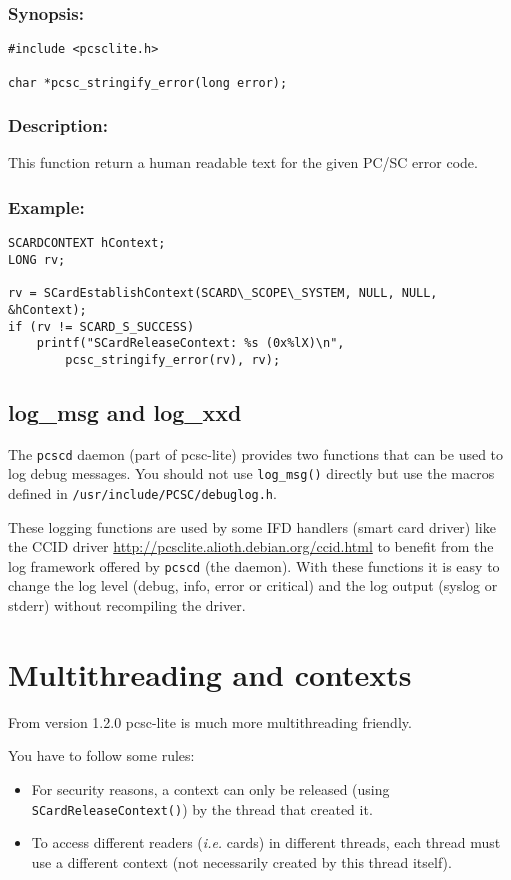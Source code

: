 \documentclass[a4paper,12pt]{article}
\newcommand{\synopsis}{\subsubsection{Synopsis:}}
\newcommand{\desc}{\subsubsection{Description:}}
\newcommand{\example}{\subsubsection{Example:}}
\begin{document}
\synopsis

\begin{verbatim}
#include <pcsclite.h>

char *pcsc_stringify_error(long error);
\end{verbatim}

\desc

This function return a human readable text for the given PC/SC error
code.

\example


\begin{verbatim}
SCARDCONTEXT hContext;
LONG rv;

rv = SCardEstablishContext(SCARD\_SCOPE\_SYSTEM, NULL, NULL, &hContext);
if (rv != SCARD_S_SUCCESS)
    printf("SCardReleaseContext: %s (0x%lX)\n",
        pcsc_stringify_error(rv), rv);
\end{verbatim}


\subsection{log\_msg and log\_xxd}

The \texttt{pcscd} daemon (part of pcsc-lite) provides two functions
that can be used to log debug messages. You should not use
\texttt{log\_msg()} directly but use the macros defined in
\texttt{/usr/include/PCSC/debuglog.h}.

These logging functions are used by some IFD handlers (smart card
driver) like the CCID driver
\url{http://pcsclite.alioth.debian.org/ccid.html} to benefit from the
log framework offered by \texttt{pcscd} (the daemon). With these
functions it is easy to change the log level (debug, info, error or
critical) and the log output (syslog or stderr) without recompiling the
driver.


\section{Multithreading and contexts}

From version 1.2.0 pcsc-lite is much more multithreading friendly.

You have to follow some rules:

\begin{itemize}
\item For security reasons, a context can only be released (using
\texttt{SCardReleaseContext()}) by the thread that created it.

\item To access different readers (\emph{i.e.} cards) in different
threads, each thread must use a different context (not necessarily
created by this thread itself).

\end{itemize}
\end{document}
